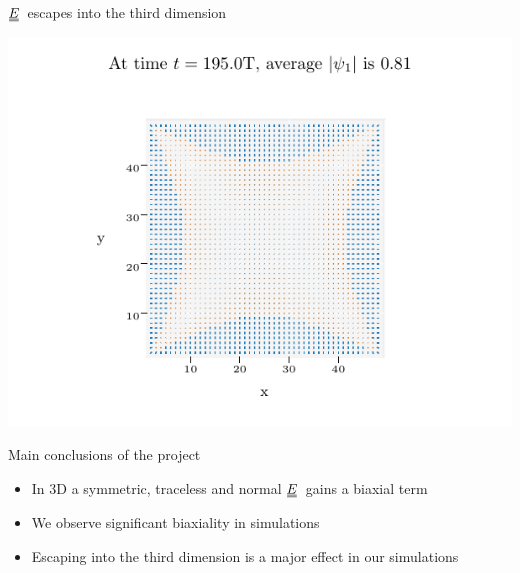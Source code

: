 \documentclass[10pt,mathserif]{beamer}
\newcommand{\duf}[2]{\stackunder[0.5pt]{\stackunder[0.8pt]{\stackunder[1pt]{\ensuremath{#1}}{\rule{\widthof{\ensuremath{#2}}*\real{0.9}}{.1ex}}}{\rule{\widthof{\ensuremath{#2}}*\real{0.9}}{.1ex}}}{}}
\newcommand{\du}[1]{\duf{#1}{#1}}
\newcommand{\EE}{\ensuremath{\du{E}}}
\begin{document}
\begin{frame}[fragile]{\EE\ escapes into the third dimension}
    \newrefsection
    \begin{center}
        \includegraphics{figures/data_plots/walls_seed_4.pdf}
    \end{center}
\end{frame}

\begin{frame}[fragile]{Main conclusions of the project}
    \newrefsection
    \begin{itemize}
        \setlength\itemsep{2em}
        \item In 3D a symmetric, traceless and normal \EE\ gains a biaxial term
        \item We observe significant biaxiality in simulations
        \item Escaping into the third dimension is a major effect in our simulations
    \end{itemize}
\end{frame}
\end{document}
